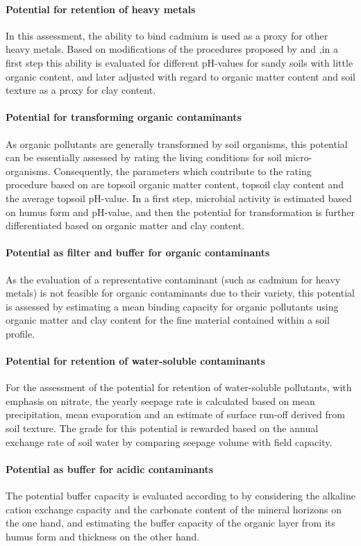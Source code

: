 \documentclass[preprint,12pt,authoryear]{elsarticle}
\begin{document}
\paragraph{Potential for retention of heavy metals}
In this assessment, the ability to bind cadmium is used as a proxy for other heavy metals. Based on modifications of the procedures proposed by \cite{AGBoden2000} and \cite{BAYGLA2003},in a first step this ability is evaluated for different pH-values for sandy soils with little organic content, and later adjusted with regard to organic matter content and soil texture as a proxy for clay content.
\paragraph{Potential for transforming organic contaminants}
As organic pollutants are generally transformed by soil organisms, this potential can be essentially assessed by rating the living conditions for soil micro-organisms. Consequently, the parameters which contribute to the rating procedure based on \cite{LUBW1995}  are topsoil organic matter content, topsoil clay content and the average topsoil pH-value. In a first step, microbial activity is estimated based on humus form and pH-value, and then the potential for transformation is further differentiated based on organic matter and clay content.
\paragraph{Potential as  filter and buffer for organic contaminants}
As the evaluation of a representative contaminant (such as cadmium for heavy metals) is not feasible for organic contaminants due to their variety, this potential is assessed by estimating a mean binding capacity for organic pollutants using organic matter and clay content for the fine material contained within a soil profile.
\paragraph{Potential for retention of water-soluble contaminants}
For the assessment of the potential for retention of water-soluble pollutants, with emphasis on nitrate, the yearly seepage rate is calculated based on mean precipitation, mean evaporation and an estimate of surface run-off derived from soil texture. The grade for this potential is rewarded based on the annual exchange rate of soil water by comparing seepage volume with field capacity.
\paragraph{Potential as buffer for acidic contaminants}
The potential buffer capacity is evaluated according to \cite{BAYGLA2003} by considering the alkaline cation exchange capacity and the carbonate content of the mineral horizons on the one hand, and estimating the buffer capacity of the organic layer from its humus form and thickness on the other hand.
\end{document}
